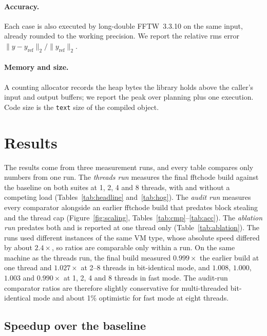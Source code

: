 \documentclass[10pt]{article}
\theoremstyle{definition}
\begin{document}
\paragraph{Accuracy.} Each case is also executed by long-double FFTW~3.3.10 on the same input, already rounded to the working precision. We report the relative rms error $\lVert y-y_{\text{ref}}\rVert_2/\lVert y_{\text{ref}}\rVert_2$.

\paragraph{Memory and size.} A counting allocator records the heap bytes the library holds above the caller's input and output buffers; we report the peak over planning plus one execution. Code size is the \texttt{text} size of the compiled object.

\section{Results}\label{sec:results}

The results come from three measurement runs, and every table compares only numbers from one run. The \emph{threads run} measures the final fftchode build against the baseline on both suites at 1, 2, 4 and 8 threads, with and without a competing load (Tables~\ref{tab:headline} and~\ref{tab:hog}). The \emph{audit run} measures every comparator alongside an earlier fftchode build that predates block stealing and the thread cap (Figure~\ref{fig:scaling}, Tables~\ref{tab:cmp}--\ref{tab:acc}). The \emph{ablation run} predates both and is reported at one thread only (Table~\ref{tab:ablation}). The runs used different instances of the same VM type, whose absolute speed differed by about $2.4\times$, so ratios are comparable only within a run. On the same machine as the threads run, the final build measured $0.999\times$ the earlier build at one thread and $1.027\times$ at 2--8 threads in bit-identical mode, and $1.008$, $1.000$, $1.003$ and $0.990\times$ at 1, 2, 4 and 8 threads in fast mode. The audit-run comparator ratios are therefore slightly conservative for multi-threaded bit-identical mode and about 1\% optimistic for fast mode at eight threads.

\subsection{Speedup over the baseline}
\end{document}
